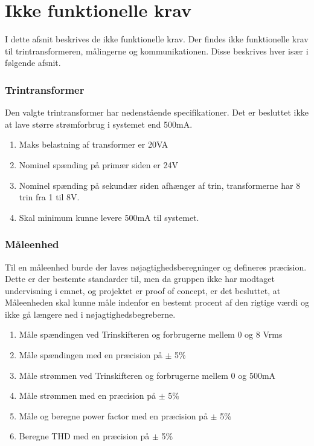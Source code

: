 
\section{Ikke funktionelle krav}
I dette afsnit beskrives de ikke funktionelle krav. Der findes ikke funktionelle krav til trintransformeren, målingerne og kommunikationen. Disse beskrives hver især i følgende afsnit.

\subsubsection{Trintransformer}
Den valgte trintransformer har nedenstående specifikationer. Det er besluttet ikke at lave større strømforbrug i systemet end 500mA. 

\begin{enumerate}
	\item Maks belastning af transformer er 20VA
	\item Nominel spænding på primær siden er 24V
	\item Nominel spænding på sekundær siden afhænger af trin, transformerne har 8 trin fra 1 til 8V.
	\item Skal minimum kunne levere 500mA til systemet. 
\end{enumerate}

\subsubsection{Måleenhed}
Til en måleenhed burde der laves nøjagtighedsberegninger og defineres præcision. Dette er der bestemte standarder til, men da gruppen ikke har modtaget undervisning i emnet, og projektet er proof of concept, er det besluttet, at Måleenheden skal kunne måle indenfor en bestemt procent af den rigtige værdi og ikke gå længere ned i nøjagtighedsbegreberne.

\begin{enumerate}
	\item Måle spændingen ved Trinskifteren og forbrugerne mellem 0 og 8 Vrms
	\item Måle spændingen med en præcision på $\pm$ 5\%
	\item Måle strømmen ved Trinskifteren og forbrugerne mellem 0 og 500mA
	\item Måle strømmen med en præcision på $\pm$ 5\%
	\item Måle og beregne power factor med en præcision på $\pm$ 5$\%$
	\item Beregne THD med en præcision på $\pm$ 5$\%$
\end{enumerate} 

